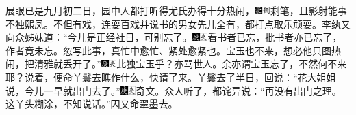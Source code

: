 展眼已是九月初二日，园中人都打听得尤氏办得十分热闹，{\includegraphics[width=3mm]{../Images/00006}\includegraphics[width=3mm]{../Images/00011}\footnotesize \kaishu 剩笔，且影射能事不独熙凤。}不但有戏，连耍百戏并说书的男女先儿全有，都打点取乐顽耍。李纨又向众姊妹道：``今儿是正经社日，可别忘了。{\includegraphics[width=3mm]{../Images/00004}\includegraphics[width=3mm]{../Images/00012}\footnotesize \kaishu 看书者已忘，批书者亦已忘了，作者竟未忘。忽写此事，真忙中愈忙、紧处愈紧也。}宝玉也不来，想必他只图热闹，把清雅就丢开了。''{\includegraphics[width=3mm]{../Images/00004}\includegraphics[width=3mm]{../Images/00012}\footnotesize \kaishu 此独宝玉乎？亦骂世人。余亦谓宝玉忘了，不然何不来耶？}说着，便命丫鬟去瞧作什么，快请了来。丫鬟去了半日，回说：``花大姐姐说，今儿一早就出门去了。''{\includegraphics[width=3mm]{../Images/00004}\includegraphics[width=3mm]{../Images/00012}\footnotesize \kaishu 奇文。}众人听了，都诧异说：``再没有出门之理。这丫头糊涂，不知说话。''因又命翠墨去。

